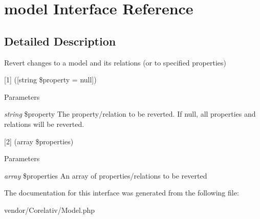 \hypertarget{interfacemodel}{
\section{model Interface Reference}
\label{interfacemodel}
}


\subsection{Detailed Description}
Revert changes to a model and its relations (or to specified properties)

\mbox{[}1\mbox{]} (\mbox{[}string \$property = null\mbox{]}) 
\begin{DoxyParams}{Parameters}
\item[{\em string}]\$property The property/relation to be reverted. If null, all properties and relations will be reverted.\end{DoxyParams}
\mbox{[}2\mbox{]} (array \$properties) 
\begin{DoxyParams}{Parameters}
\item[{\em array}]\$properties An array of properties/relations to be reverted \end{DoxyParams}


The documentation for this interface was generated from the following file:\begin{DoxyCompactItemize}
\item 
vendor/Corelativ/Model.php\end{DoxyCompactItemize}
